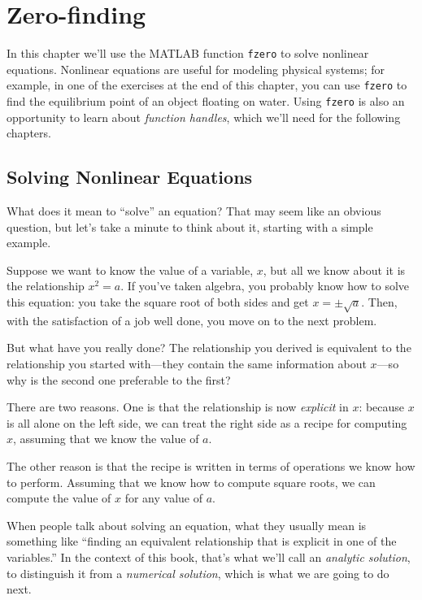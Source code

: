\chapter{Zero-finding}
\label{fzero}

In this chapter we'll use the MATLAB function \lstinline{fzero} to solve nonlinear equations.
Nonlinear equations are useful for modeling physical systems; for example, in one of
the exercises at the end of this chapter, you can use \lstinline{fzero} to find the equilibrium point of an object floating on water.
Using \lstinline{fzero} is also an opportunity to learn about {\em function handles}, which we'll need for the following chapters.

\section{Solving Nonlinear Equations}


What does it mean to ``solve'' an equation?  That may seem like an
obvious question, but let's take a minute to think about it,
starting with a simple example.

Suppose we want to know the
value of a variable, $x$, but all we know about it is the relationship
$x^2 = a$. If you've taken algebra, you probably know how to solve this
equation: you take the square root of both sides and get
$x = \pm \sqrt{a}$.  Then, with the satisfaction of a job well done,
you move on to the next problem.


But what have you really done?  The relationship you derived is
equivalent to the relationship you started with---they contain the
same information about $x$---so why is the second one preferable
to the first?

There are two reasons.  One is that the relationship is now \emph{explicit} in $x$: because $x$ is all alone on the left side, we can treat the right side as a recipe for computing $x$, assuming that we know the value of $a$.


The other reason is that the recipe is written in terms of operations
we know how to perform.  Assuming that we know how to compute square
roots, we can compute the value of $x$ for any value of $a$.

When people talk about solving an equation, what they usually mean
is something like ``finding an equivalent relationship that is
explicit in one of the variables.''  In the context of this book,
that's what we'll call an {\em analytic solution}, to distinguish
it from a {\em numerical solution}, which is what we are going to
do next.

